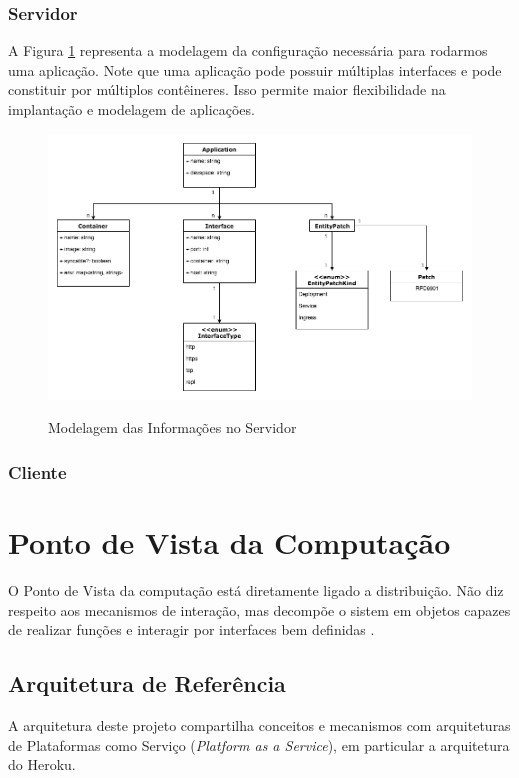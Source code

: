 	        \subsubsection{Servidor}
	        A Figura \ref{fig:info-server} representa a modelagem da configuração necessária para rodarmos uma aplicação. Note que uma aplicação pode possuir múltiplas interfaces e pode constituir por múltiplos contêineres. Isso permite maior flexibilidade na implantação e modelagem de aplicações.
	        \begin{figure}[htb]
        	    \centering
        	    \caption{Modelagem das Informações no Servidor}
        	    \includegraphics[scale=0.40]{pictures/especificacao-de-requisitos/info-server.png}
        	    \label{fig:info-server}
	        \end{figure}
	        \subsubsection{Cliente}
	            
	\section{Ponto de Vista da Computação}
	    O Ponto de Vista da computação está diretamente ligado a distribuição. Não diz respeito aos mecanismos de interação, mas decompõe o sistem em objetos capazes de realizar funções e interagir por interfaces bem definidas \cite{odppart1}.
	    \subsection{Arquitetura de Referência}
	        A arquitetura deste projeto compartilha conceitos e mecanismos com arquiteturas de Plataformas como Serviço (\textit{Platform as a Service}), em particular a arquitetura do Heroku.
	        
